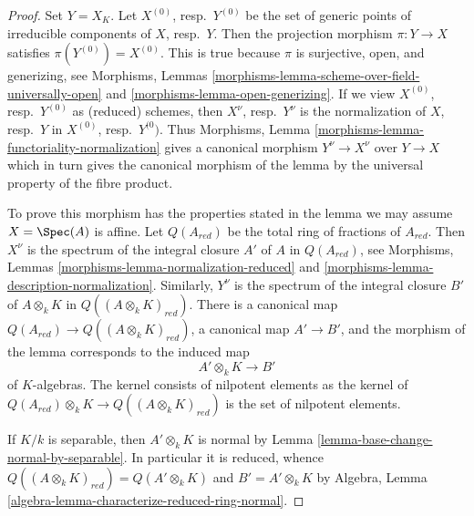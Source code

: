 \begin{proof}
Set $Y = X_K$. Let $X^{(0)}$, resp.\ $Y^{(0)}$ be the set of generic points
of irreducible components of $X$, resp.\ $Y$. Then the projection morphism
$\pi : Y \to X$ satisfies $\pi(Y^{(0)}) = X^{(0)}$. This is true because
$\pi$ is surjective, open, and generizing, see
Morphisms, Lemmas \ref{morphisms-lemma-scheme-over-field-universally-open} and
\ref{morphisms-lemma-open-generizing}.
If we view $X^{(0)}$, resp.\ $Y^{(0)}$ as (reduced) schemes, then
$X^\nu$, resp.\ $Y^\nu$ is the normalization of $X$, resp.\ $Y$ in
$X^{(0)}$, resp.\ $Y^{(0})$.
Thus Morphisms, Lemma \ref{morphisms-lemma-functoriality-normalization}
gives a canonical morphism $Y^\nu \to X^\nu$ over $Y \to X$ which in
turn gives the canonical morphism of the lemma by the universal
property of the fibre product.

\medskip\noindent
To prove this morphism has the properties stated in the lemma we may
assume $X = \Spec(A)$ is affine. Let $Q(A_{red})$ be the
total ring of fractions of $A_{red}$. Then $X^\nu$ is the spectrum of
the integral closure $A'$ of $A$ in $Q(A_{red})$, see
Morphisms, Lemmas \ref{morphisms-lemma-normalization-reduced} and
\ref{morphisms-lemma-description-normalization}.
Similarly, $Y^\nu$ is the spectrum of the integral closure $B'$ of
$A \otimes_k K$ in $Q((A \otimes_k K)_{red})$. There is a canonical
map $Q(A_{red}) \to Q((A \otimes_k K)_{red})$, a canonical map
$A' \to B'$, and the morphism of the lemma corresponds to the induced map
$$
A' \otimes_k K \longrightarrow B'
$$
of $K$-algebras. The kernel consists of nilpotent
elements as the kernel of $Q(A_{red}) \otimes_k K \to Q((A \otimes_k K)_{red})$
is the set of nilpotent elements.

\medskip\noindent
If $K/k$ is separable, then $A' \otimes_k K$ is normal by
Lemma \ref{lemma-base-change-normal-by-separable}. In particular
it is reduced, whence $Q((A \otimes_k K)_{red}) = Q(A' \otimes_k K)$
and $B' = A' \otimes_k K$ by
Algebra, Lemma \ref{algebra-lemma-characterize-reduced-ring-normal}.


\end{proof}
